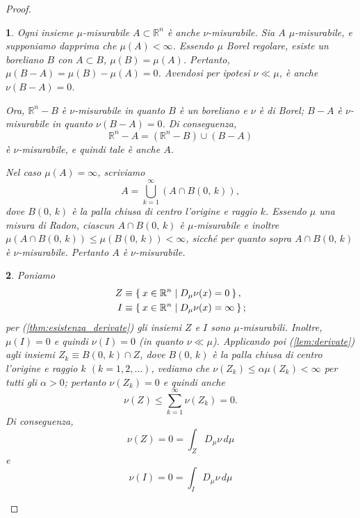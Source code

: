 \documentclass[a4paper,10pt,openright,oneside]{book}
\theoremstyle{theoremstyle}
\theoremstyle{theoremstylewoheader}
\theoremstyle{theoremstyle}
\theoremstyle{proofsecstyle}
\newtheorem{proofsec}{}
\theoremstyle{nonumberplain}
\newtheorem{proof}{Dim.}
\newcommand{\RR}{\ensuremath{\mathbb{R}}}
\newcommand{\Der}[2]{\ensuremath{D_#2 #1}}
\begin{document}
\begin{proof}
\begin{proofsec}
\emph{Ogni insieme $\mu$-misurabile $A \subset \RR^n$ è anche $\nu$-misurabile.}\hspace{.5em} Sia $A$ $\mu$-misurabile, e supponiamo dapprima che $\mu(A) < \infty$. Essendo $\mu$ Borel regolare, esiste un boreliano $B$ con $A \subset B$, $\mu(B) = \mu(A)$. Pertanto, $\mu(B - A) = \mu(B) - \mu(A) = 0$. Avendosi per ipotesi $\nu \ll \mu$, è anche $\nu(B - A) = 0$.

Ora, $\RR^n - B$ è $\nu$-misurabile in quanto $B$ è un boreliano e $\nu$ è di Borel; $B - A$ è $\nu$-misurabile in quanto $\nu(B - A) = 0$. Di conseguenza,
\[
\RR^n - A = (\RR^n - B) \cup (B - A)
\]
è $\nu$-misurabile, e quindi tale è anche $A$.

Nel caso $\mu(A) = \infty$, scriviamo
\[
A = \bigcup_{k=1}^\infty (A \cap B(0,\, k)),
\]
dove $B(0,\, k)$ è la palla chiusa di centro l'origine e raggio $k$. Essendo $\mu$ una misura di Radon, ciascun $A \cap B(0,\, k)$ è $\mu$-misurabile e inoltre $\mu(A \cap B(0,\, k)) \le \mu(B(0,\, k)) < \infty$, sicché per quanto sopra $A \cap B(0,\, k)$ è $\nu$-misurabile. Pertanto $A$ è $\nu$-misurabile.
\end{proofsec}

\begin{proofsec}
Poniamo
\begin{align*}
Z &\equiv \Set{ x \in \RR^n | \Der{\nu}{\mu}(x) = 0 },\\
I &\equiv \Set{ x \in \RR^n | \Der{\nu}{\mu}(x) = \infty };
\end{align*}
per (\ref{thm:esistenza_derivate}) gli insiemi $Z$ e $I$ sono $\mu$-misurabili. Inoltre, $\mu(I) = 0$ e quindi $\nu(I) = 0$ (in quanto $\nu\ll\mu$). Applicando poi (\ref{lem:derivate}) agli insiemi $Z_k \equiv B(0,\, k) \cap Z$, dove $B(0,\, k)$ è la palla chiusa di centro l'origine e raggio $k$ $(k = 1, 2, \ldots)$, vediamo che $\nu(Z_k) \le \alpha\mu(Z_k) < \infty$ per tutti gli $\alpha > 0$; pertanto $\nu(Z_k) = 0$ e quindi anche
\[
\nu(Z) \le \sum_{k=1}^\infty \nu(Z_k) = 0.
\]
Di conseguenza,
\[
\nu(Z) = 0 = \int_Z \Der{\nu}{\mu}\, d\mu
\]
e
\[
\nu(I) = 0 = \int_I \Der{\nu}{\mu}\, d\mu
\]
\end{proofsec}


\end{proof}
\end{document}
